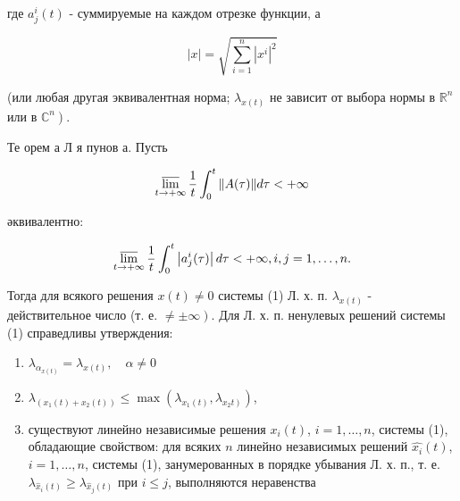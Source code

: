 \documentclass[10pt]{article}
\begin{document}
где $a_{j}^{i}(t)$ - суммируемые на каждом отрезке функции, а



\[

|x|=\sqrt{\sum_{i=1}^{n}\left|x^{i}\right|^{2}}

\]



(или любая другая эквивалентная норма; $\lambda_{x(t)}$ не зависит от выбора нормы в $\mathbb{R}^{n}$ или в $\left.\mathbb{C}^{n}\right)$.



Те орем а Л я пунов а. Пусть



\[

\varlimsup_{t \rightarrow+\infty} \frac{1}{t} \int_{0}^{t}\|A(\tau)\| d \tau<+\infty

\]



әквивалентно:



\[

\varlimsup_{t \rightarrow+\infty} \frac{1}{t} \int_{0}^{t}\left|a_{j}^{i}(\tau)\right| d \tau<+\infty, i, j=1, \ldots, n .

\]



Тогда для всякого решения $x(t) \neq 0$ системы (1) Л. х. п. $\lambda_{x(t)}$ - действительное число (т. е. $\left.\neq \pm \infty\right)$. Для Л. х. п. ненулевых решений системы (1) справедливы утверждения:



\begin{enumerate}

  \item $\lambda_{\alpha_{x(t)}}=\lambda_{x(t)}, \quad \alpha \neq 0$



  \item $\lambda_{\left(x_{1}(t)+x_{2}(t)\right)} \leqslant \max \left(\lambda_{x_{1}(t)}, \lambda_{\left.x_{2} t\right)}\right)$,



  \item существуют линейно независимые решения $x_{i}(t)$, $i=1, \ldots, n$, системы (1), обладающие свойством: для всяких $n$ линейно независимых решений $\widehat{x_{i}}(t)$, $i=1, \ldots, n$, системы (1), занумерованных в порядке убывания Л. х. п., т. е. $\lambda_{\hat{x}_{i}(t)} \geqslant \lambda_{\hat{x}_{j}(t)}$ при $i \leqslant j$, выполняются неравенства



\end{enumerate}
\end{document}
